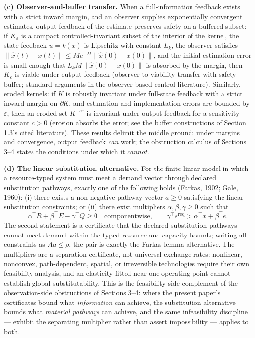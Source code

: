 \documentclass[11pt]{article}
\begin{document}
\textbf{(c) Observer-and-buffer transfer.} When a full-information
feedback exists with a strict inward margin, and an observer supplies
exponentially convergent estimates, output feedback of the estimate
preserves safety on a buffered subset: if \(K_\varepsilon\) is a compact
controlled-invariant subset of the interior of the kernel, the state
feedback \(u = k(x)\) is Lipschitz with constant \(L_k\), the observer
satisfies
\(\|\hat x(t) - x(t)\| \le M e^{-\lambda t}\|\hat x(0) - x(0)\|\), and
the initial estimation error is small enough that
\(L_k M \|\hat x(0) - x(0)\|\) is absorbed by the margin, then
\(K_\varepsilon\) is viable under output feedback (observer-to-viability
transfer with safety buffer; standard arguments in the observer-based
control literature). Similarly, eroded kernels: if \(K\) is robustly
invariant under full-state feedback with a strict inward margin on
\(\partial K\), and estimation and implementation errors are bounded by
\(\varepsilon\), then an eroded set \(K^{-c\varepsilon}\) is invariant
under output feedback for a sensitivity constant \(c > 0\) (erosion
absorbs the error; see the buffer constructions of Section 1.3's cited
literature). These results delimit the middle ground: under margins and
convergence, output feedback \emph{can} work; the obstruction calculus
of Sections 3--4 states the conditions under which it \emph{cannot}.

\textbf{(d) The linear substitution alternative.} For the finite linear
model in which a resource-typed system must meet a demand vector through
declared substitution pathways, exactly one of the following holds
(Farkas, 1902; Gale, 1960): (i) there exists a non-negative pathway
vector \(a \ge 0\) satisfying the linear substitution constraints; or
(ii) there exist multipliers \(\alpha, \beta, \gamma \ge 0\) such that
\[\alpha^\top R + \beta^\top E - \gamma^\top Q \ge 0 \quad\text{componentwise},\qquad \gamma^\top s^{\mathrm{req}} > \alpha^\top x + \beta^\top e.\]
The second statement is a certificate that the declared substitution
pathways cannot meet demand within the typed resource and capacity
bounds; writing all constraints as \(Aa \le \rho\), the pair is exactly
the Farkas lemma alternative. The multipliers are a separation
certificate, not universal exchange rates: nonlinear, nonconvex,
path-dependent, spatial, or irreversible technologies require their own
feasibility analysis, and an elasticity fitted near one operating point
cannot establish global substitutability. This is the feasibility-side
complement of the observation-side obstructions of Sections 3--4: where
the present paper's certificates bound what \emph{information} can
achieve, the substitution alternative bounds what \emph{material
pathways} can achieve, and the same infeasibility discipline --- exhibit
the separating multiplier rather than assert impossibility --- applies
to both.
\end{document}
